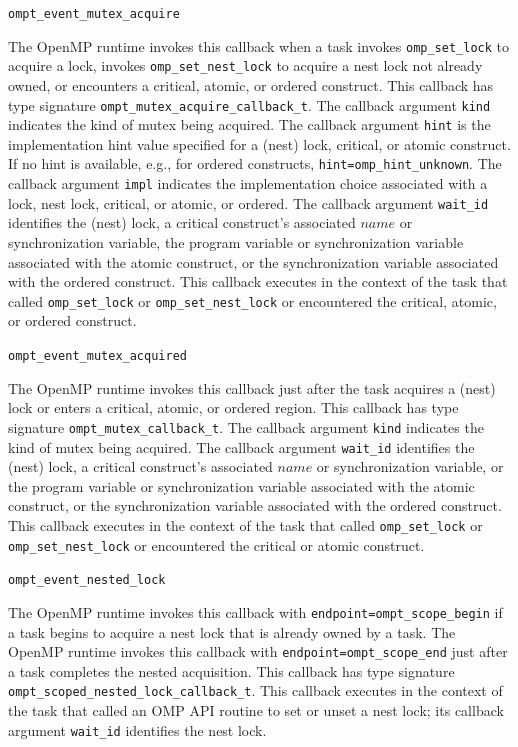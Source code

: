 \documentclass{article}
\newcommand{\descheader}[1]{{\needspace{3\baselineskip}\vspace{1em}\noindent \fbox{#1}}}
\begin{document}
\descheader{Lock, Nest Lock, Critical Section, Atomic, and Ordered}

\begin{description}

\item \verb|ompt_event_mutex_acquire| 

\sloppy
   The OpenMP runtime invokes this callback when a task invokes
    \verb|omp_set_lock| to acquire a lock, invokes \verb|omp_set_nest_lock| to acquire a nest lock not already owned,
   or encounters a critical, atomic, or ordered construct. 
   This callback has type signature \verb|ompt_mutex_acquire_callback_t|. 
    The callback argument \verb|kind| indicates the kind of mutex being acquired.
    The callback argument \verb|hint| is the implementation hint value specified for a (nest) lock, critical, or atomic construct.
    If no hint is available, e.g., for ordered constructs, \verb|hint=omp_hint_unknown|.
   The callback argument \verb|impl| indicates the implementation choice associated with a lock, nest lock, critical, or atomic, or ordered.
   The callback argument \verb|wait_id| identifies the (nest) lock, a critical construct's associated $name$ or synchronization variable, the program variable or synchronization variable associated with the atomic construct, or the synchronization variable associated with the ordered construct.
   This callback executes in the context of the task that called \verb|omp_set_lock| or \verb|omp_set_nest_lock| or encountered the
   critical, atomic, or ordered construct.

\item \verb|ompt_event_mutex_acquired| 

   The OpenMP runtime invokes this callback just after the task acquires a (nest) lock or enters a critical, atomic, or ordered region.
   This callback has type signature \verb|ompt_mutex_callback_t|. 
   The callback argument \verb|kind| indicates the kind of mutex being acquired.
   The callback argument \verb|wait_id| identifies the (nest) lock, a critical construct's associated $name$ or synchronization variable, or the program variable or synchronization variable associated with the atomic construct, or the synchronization variable associated with the ordered construct.
   This callback executes in the context of the task that called \verb|omp_set_lock| or \verb|omp_set_nest_lock| or encountered the
   critical or atomic construct.

\item \verb|ompt_event_nested_lock|

\sloppy
   The OpenMP runtime invokes this callback with \verb|endpoint=|\verb|ompt_scope_begin| if a task begins to acquire a nest lock that is already owned by a task.
   The OpenMP runtime invokes this callback with \verb|endpoint=|\verb|ompt_scope_end|  just after a task completes the nested acquisition.
   This callback  has type signature \verb|ompt_scoped_nested_lock_callback_t|. 
   This callback executes in the context of the task that called an OMP API routine to set or unset a nest lock; its
   callback argument \verb|wait_id| identifies the nest lock.

\end{description}
\end{document}
